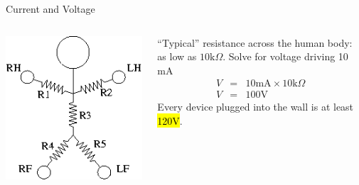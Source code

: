 \documentclass{presentation}
\begin{document}
\begin{frame}{Current and Voltage}
  \begin{columns}
    \begin{column}{0.33\textwidth}
      \includegraphics[width=\textwidth]{"./resistor-person.png"}
    \end{column}
    \begin{column}{0.67\textwidth}
      ``Typical'' resistance across the human body: \\ as low as $10\mathrm{k}\Omega$.
      Solve for voltage driving 10 mA
      \begin{eqnarray*}
        V &=& 10 \mathrm{mA} \times 10 \mathrm{k}\Omega \\
        V &=& 100 \mathrm{V}
      \end{eqnarray*}
      Every device plugged into the wall is at least \hl{120V}.
    \end{column}
  \end{columns}
\end{frame}
\end{document}
